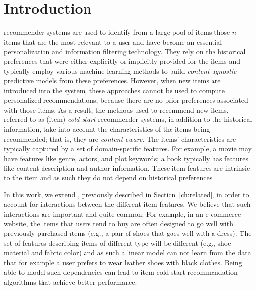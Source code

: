 \section{Introduction} \label{ch:bilinear:introduction}

\TOPN recommender systems are used to identify from a large pool of items those $n$
items that are the most relevant to a user and have become an essential
personalization and information filtering technology. They rely on the historical
preferences that were either explicitly or implicitly provided for the items and
typically employ various machine learning methods to build \emph{content-agnostic}
predictive models from these preferences. However, when new items are introduced into
the system, these approaches cannot be used to compute personalized recommendations,
because there are no prior preferences associated with those items.
%
As a result, the methods used to recommend new items, referred to as (item)
\emph{cold-start} recommender systems, in addition to the historical information,
take into account the characteristics of the items being recommended; that is, they
are \emph{content aware}. The items' characteristics are typically captured by a set
of domain-specific features. For example, a movie may have features like genre,
actors, and plot keywords; a book typically has features like content description and
author information. These item features are intrinsic to the item and as such they do
not depend on historical preferences. 





\iffalse 
Besides the non-collaborative models, another important group of techniques used in cold-start recommender systems are collaborative methods~\cite{r1,r2,r3,r9}, which are based on latent factors. These models leverage the knowledge
available from all the users and their past preferences. However, these latent
factor methods don't perform well when sparsity of dataset grows, i.e., items have limited number of preferences on average~\cite{r29}.
\fi

In this work, we extend \CFLIN, previously described in Section~\ref{ch:related}, 
in order to account for interactions between the
different item features. We believe that such interactions are
important and quite common. For example, in an e-commerce website, the items
that users tend to buy are often designed to go well with previously purchased
items (e.g., a pair of shoes that goes well with a dress). The set of features
describing items of different type will be different (e.g., shoe material and
fabric color) and as such a linear model can not learn from the data that for
example a user prefers to wear leather shoes with black clothes. Being able to model such
dependencies can lead to item cold-start recommendation algorithms that achieve
better performance.

